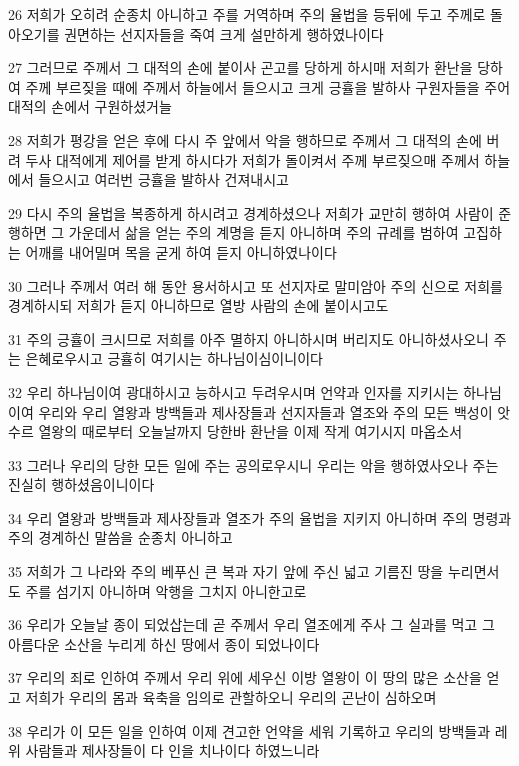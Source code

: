 \par 26 저희가 오히려 순종치 아니하고 주를 거역하며 주의 율법을 등뒤에 두고 주께로 돌아오기를 권면하는 선지자들을 죽여 크게 설만하게 행하였나이다
\par 27 그러므로 주께서 그 대적의 손에 붙이사 곤고를 당하게 하시매 저희가 환난을 당하여 주께 부르짖을 때에 주께서 하늘에서 들으시고 크게 긍휼을 발하사 구원자들을 주어 대적의 손에서 구원하셨거늘
\par 28 저희가 평강을 얻은 후에 다시 주 앞에서 악을 행하므로 주께서 그 대적의 손에 버려 두사 대적에게 제어를 받게 하시다가 저희가 돌이켜서 주께 부르짖으매 주께서 하늘에서 들으시고 여러번 긍휼을 발하사 건져내시고
\par 29 다시 주의 율법을 복종하게 하시려고 경계하셨으나 저희가 교만히 행하여 사람이 준행하면 그 가운데서 삶을 얻는 주의 계명을 듣지 아니하며 주의 규례를 범하여 고집하는 어깨를 내어밀며 목을 굳게 하여 듣지 아니하였나이다
\par 30 그러나 주께서 여러 해 동안 용서하시고 또 선지자로 말미암아 주의 신으로 저희를 경계하시되 저희가 듣지 아니하므로 열방 사람의 손에 붙이시고도
\par 31 주의 긍휼이 크시므로 저희를 아주 멸하지 아니하시며 버리지도 아니하셨사오니 주는 은혜로우시고 긍휼히 여기시는 하나님이심이니이다
\par 32 우리 하나님이여 광대하시고 능하시고 두려우시며 언약과 인자를 지키시는 하나님이여 우리와 우리 열왕과 방백들과 제사장들과 선지자들과 열조와 주의 모든 백성이 앗수르 열왕의 때로부터 오늘날까지 당한바 환난을 이제 작게 여기시지 마옵소서
\par 33 그러나 우리의 당한 모든 일에 주는 공의로우시니 우리는 악을 행하였사오나 주는 진실히 행하셨음이니이다
\par 34 우리 열왕과 방백들과 제사장들과 열조가 주의 율법을 지키지 아니하며 주의 명령과 주의 경계하신 말씀을 순종치 아니하고
\par 35 저희가 그 나라와 주의 베푸신 큰 복과 자기 앞에 주신 넓고 기름진 땅을 누리면서도 주를 섬기지 아니하며 악행을 그치지 아니한고로
\par 36 우리가 오늘날 종이 되었삽는데 곧 주께서 우리 열조에게 주사 그 실과를 먹고 그 아름다운 소산을 누리게 하신 땅에서 종이 되었나이다
\par 37 우리의 죄로 인하여 주께서 우리 위에 세우신 이방 열왕이 이 땅의 많은 소산을 얻고 저희가 우리의 몸과 육축을 임의로 관할하오니 우리의 곤난이 심하오며
\par 38 우리가 이 모든 일을 인하여 이제 견고한 언약을 세워 기록하고 우리의 방백들과 레위 사람들과 제사장들이 다 인을 치나이다 하였느니라

